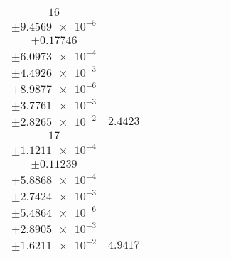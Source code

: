 \documentclass[8pt]{article}
\begin{document}
\begin{longtable}[l]{c c c c c c c c c}
$\num{16}$ & \begin{tabular}[c]{@{}c@{}}$\num{3.0314e-2}$ \\ $\pm\num{9.4569e-5}$\end{tabular} & \begin{tabular}[c]{@{}c@{}}$\num{-0.78093}$ \\ $\pm\num{0.17746}$\end{tabular} & \begin{tabular}[c]{@{}c@{}}$\num{2.5921}$ \\ $\pm\num{6.0973e-4}$\end{tabular} & \begin{tabular}[c]{@{}c@{}}$\num{1.612e+3}$ \\ $\pm\num{4.4926e-3}$\end{tabular} & \begin{tabular}[c]{@{}c@{}}$\num{3.2248}$ \\ $\pm\num{8.9877e-6}$\end{tabular} & \begin{tabular}[c]{@{}c@{}}$\num{1.179}$ \\ $\pm\num{3.7761e-3}$\end{tabular} & \begin{tabular}[c]{@{}c@{}}$\num{4.001}$ \\ $\pm\num{2.8265e-2}$\end{tabular} & $\num{2.4423}$\\
$\num{17}$ & \begin{tabular}[c]{@{}c@{}}$\num{6.6885e-2}$ \\ $\pm\num{1.1211e-4}$\end{tabular} & \begin{tabular}[c]{@{}c@{}}$\num{-4.6314e-2}$ \\ $\pm\num{0.11239}$\end{tabular} & \begin{tabular}[c]{@{}c@{}}$\num{6.9499}$ \\ $\pm\num{5.8868e-4}$\end{tabular} & \begin{tabular}[c]{@{}c@{}}$\num{1.6163e+3}$ \\ $\pm\num{2.7424e-3}$\end{tabular} & \begin{tabular}[c]{@{}c@{}}$\num{3.2335}$ \\ $\pm\num{5.4864e-6}$\end{tabular} & \begin{tabular}[c]{@{}c@{}}$\num{1.8027}$ \\ $\pm\num{2.8905e-3}$\end{tabular} & \begin{tabular}[c]{@{}c@{}}$\num{4.4341}$ \\ $\pm\num{1.6211e-2}$\end{tabular} & $\num{4.9417}$\\

\end{longtable}
\end{document}
